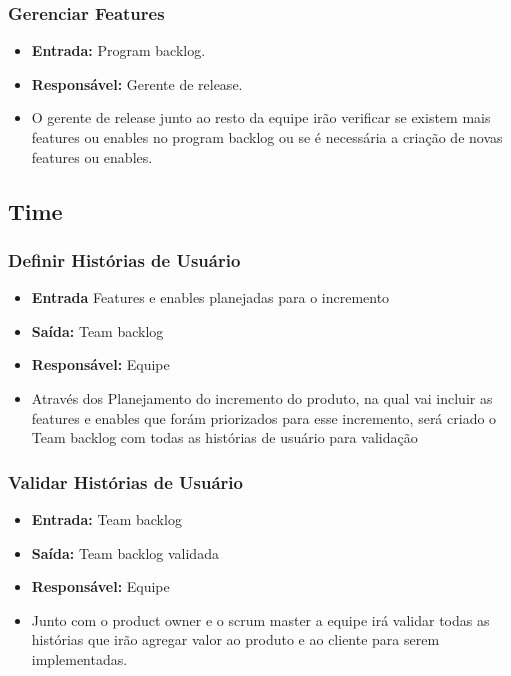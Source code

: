 \subsubsection{Gerenciar Features}
  \begin{itemize}
    \item \textbf{Entrada:} Program backlog.
    \item \textbf{Responsável:} Gerente de release.
    \item O gerente de release junto ao resto da equipe irão verificar se existem mais features ou enables no program backlog ou se é
      necessária a criação de novas features ou enables.
  \end{itemize}

\subsection{\textbf{Time}}

\subsubsection{Definir Histórias de Usuário}
  \begin{itemize}
    \item \textbf{Entrada} Features e enables planejadas para o incremento
    \item \textbf{Saída:} Team backlog
    \item \textbf{Responsável:} Equipe
    \item Através dos Planejamento do incremento do produto, na qual vai incluir as features e enables que forám priorizados para esse
      incremento, será criado o Team backlog com todas as histórias de usuário para validação
  \end{itemize}

\subsubsection{Validar Histórias de Usuário}
  \begin{itemize}
    \item \textbf{Entrada:} Team backlog
    \item \textbf{Saída:} Team backlog validada
    \item \textbf{Responsável:} Equipe
    \item Junto com o product owner e o scrum master a equipe irá validar todas as histórias que irão agregar valor ao produto e ao
      cliente para serem implementadas.
  \end{itemize}


